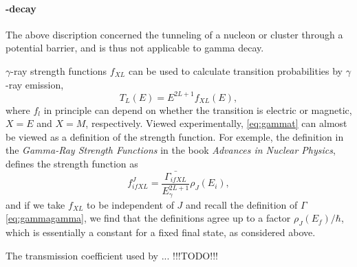\paragraph{\gamma-decay}
The above discription concerned the tunneling of a nucleon or cluster through a potential barrier, and is thus not applicable to gamma decay.

$\gamma$-ray strength functions $f_{XL}$ can be used to calculate transition probabilities by $\gamma$-ray emission, 
\begin{equation}
T_L(E) = E^{2L+1} f_{XL}(E),\label{eq:gammat}
\end{equation}
where $f_l$ in principle can depend on whether the transition is electric or magnetic, $X=E$ and $X=M$, respectively. Viewed experimentally, \eqref{eq:gammat} can almost be viewed as a definition of the strength function. For exemple, the definition in the \emph{Gamma-Ray Strength Functions} in the book \emph{Advances in Nuclear Physics}\cite{ainp:1973}, defines the strength function as
\begin{equation}
f_{ifXL}^J = \frac{\bar{\Gamma_{ifXL}}}{E^{2L+1}_\gamma}\rho_{J}(E_i),
\end{equation}
and if we take $f_{XL}$ to be independent of $J$ and recall the definition of $\Gamma$ \eqref{eq:gammagamma}, we find that the definitions agree up to a factor $\rho_J(E_f)/\hbar$, which is essentially a constant for a fixed final state, as considered above.

The transmission coefficient used by  ... !!!TODO!!!
